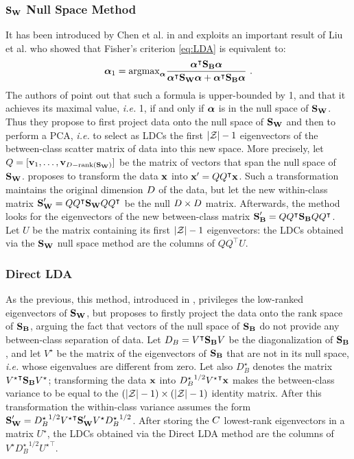 \subsubsection{$\textbf{S}_{\textbf{W}}$ Null Space Method}
It has been introduced by Chen et al. in \cite{Chen2000} and exploits an important result of Liu et al. \cite{liu1992generalized} who showed that Fisher's criterion \eqref{eq:LDA} is equivalent to:
 \begin{equation}
 \boldsymbol{\alpha}_1=\mathrm{argmax}_{\boldsymbol{\alpha}} \frac{\boldsymbol{\alpha}^\intercal \textbf{S}_{\textbf{B}} \boldsymbol{\alpha}}{\boldsymbol{\alpha}^\intercal \textbf{S}_{\textbf{W}} \boldsymbol{\alpha} + \boldsymbol{\alpha}^\intercal \textbf{S}_{\textbf{B}} \boldsymbol{\alpha}} \mbox{ .}
 \end{equation}
The authors of \cite{Chen2000} point out that such a formula is upper-bounded by 1, and that it achieves its maximal value, \textit{i.e.} 1, if and only if  $\boldsymbol{\alpha}$ is in the null space of $\textbf{S}_{\textbf{W}}$. Thus they propose to first project data onto the null space of $\textbf{S}_{\textbf{W}}$ and then to perform a PCA, \textit{i.e.} to select as LDCs the first $\lvert\mathcal{Z}\rvert - 1$ eigenvectors of the between-class scatter matrix of data into this new space. More precisely, let $Q = [\textbf{v}_1, \dots, \textbf{v}_{D - \mathrm{rank}(\textbf{S}_{\textbf{W}})}]$ be the matrix of vectors that span the null space of $\textbf{S}_{\textbf{W}}$. \cite{Chen2000} proposes to transform the data $\textbf{x}$ into $\textbf{x}^\prime = QQ^\intercal\textbf{x}$. Such a transformation maintains the original dimension $D$ of the data, but let the new within-class matrix $\textbf{S}_{\textbf{W}}' = QQ^\intercal\textbf{S}_{\textbf{W}} QQ^\intercal$ be the null $D \times D$ matrix. Afterwards, the method looks for the eigenvectors of the new between-class matrix $\textbf{S}_{\textbf{B}}' = QQ^\intercal\textbf{S}_{\textbf{B}} QQ^\intercal$. Let $U$ be the matrix containing its first $\lvert\mathcal{Z}\rvert - 1$ eigenvectors: the LDCs obtained via the $\textbf{S}_{\textbf{W}}$ null space method are the columns of $QQ^\intercal U$.

\subsubsection{Direct LDA}
As the previous, this method, introduced in \cite{Yu01adirect}, privileges the low-ranked eigenvectors of $\textbf{S}_{\textbf{W}}$, but proposes to firstly project the data onto the rank space of $\textbf{S}_{\textbf{B}}$, arguing the fact that vectors of the null space of $\textbf{S}_{\textbf{B}}$ do not provide any between-class separation of data. Let $D_B=V^\intercal\textbf{S}_{\textbf{B}} V$ be the diagonalization of $\textbf{S}_{\textbf{B}}$, and let $V^\star$ be the matrix of the eigenvectors of $\textbf{S}_{\textbf{B}}$ that are not in its null space, \textit{i.e.} whose eigenvalues are different from zero. Let also $D_B^\star$ denotes the matrix ${V^\star}^\intercal\textbf{S}_{\textbf{B}} V^\star$; transforming the data $\textbf{x}$ into ${D_B^\star}^{1/2}{V^\star}^\intercal\textbf{x}$ makes the between-class variance to be equal to   the $(\lvert\mathcal{Z}\rvert - 1) \times (\lvert\mathcal{Z}\rvert- 1)$ identity matrix. After this transformation the within-class variance assumes the form $\textbf{S}_{\textbf{W}}' = {D_B^\star}^{1/2}{V^\star}^\intercal\textbf{S}_{\textbf{W}} ' V^\star {D_B^\star}^{1/2}$. After storing the $C$ lowest-rank eigenvectors in a matrix $U^\star$, the LDCs obtained via the Direct LDA method are the columns of $V^\star{D_B^\star}^{1/2}{U^\star}^\intercal$. 


